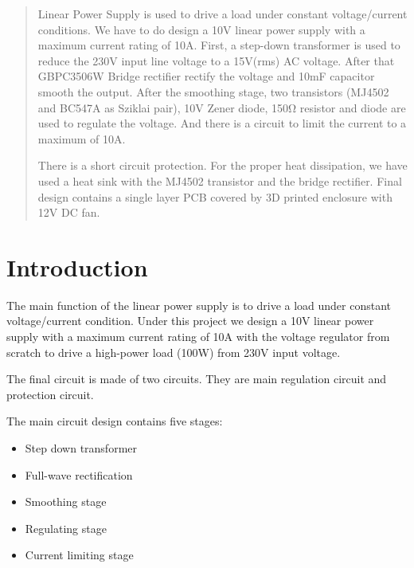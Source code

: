 \documentclass[11pt,a4paper]{article}
\begin{document}
\tableofcontents

\pagebreak

\begin{multicols}{2}
\begin{abstract}
Linear Power Supply is used to drive a load under constant voltage/current conditions. We have to do design a 10V linear power supply with a maximum current rating of 10A. First, a step-down transformer is used to reduce the 230V input line voltage to a 15V(rms) AC voltage. After that GBPC3506W Bridge rectifier rectify the voltage and 10mF capacitor smooth the output. After the smoothing stage, two transistors (MJ4502 and BC547A as Sziklai pair), 10V Zener diode, 150Ω resistor and diode are used to regulate the voltage. And there is a circuit to limit the current to a maximum of 10A.

There is a short circuit protection. For the proper heat dissipation, we have used a heat sink with the MJ4502 transistor and the bridge rectifier. Final design contains a single layer PCB covered by 3D printed enclosure with 12V DC fan.
\end{abstract}


\section{Introduction}
The main function of the linear power supply is to drive a load under constant voltage/current condition. Under this project we design a 10V linear power supply with a maximum current rating of 10A with the voltage regulator from scratch to drive a high-power load (100W) from 230V input voltage. 

The final circuit is made of two circuits. They are main regulation circuit and protection circuit. 


\begin{flushleft}
The main circuit design contains five stages:
\end{flushleft}
\vspace{-0.35in}
\begin{itemize}
  \item Step down transformer \vspace{-0.1in}
  \item Full-wave rectification \vspace{-0.1in}
  \item Smoothing stage \vspace{-0.1in}
  \item Regulating stage \vspace{-0.1in}
  \item Current limiting stage
\end{itemize}


\end{multicols}
\end{document}
